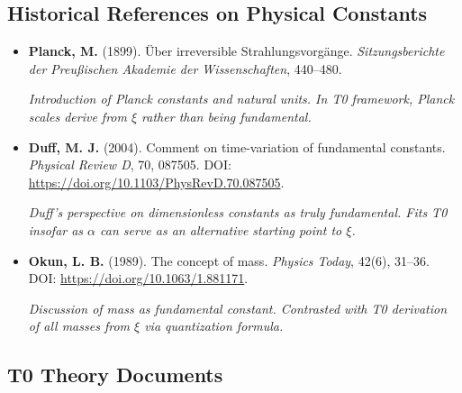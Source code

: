 	\subsection{Historical References on Physical Constants}
	
	\begin{itemize}
		\item \textbf{Planck, M.} (1899). Über irreversible Strahlungsvorgänge. \textit{Sitzungsberichte der Preußischen Akademie der Wissenschaften}, 440--480. 
		
		\textit{Introduction of Planck constants and natural units. In T0 framework, Planck scales derive from $\xi$ rather than being fundamental.}
		
		\item \textbf{Duff, M. J.} (2004). Comment on time-variation of fundamental constants. \textit{Physical Review D}, 70, 087505. DOI: \url{https://doi.org/10.1103/PhysRevD.70.087505}. 
		
		\textit{Duff's perspective on dimensionless constants as truly fundamental. Fits T0 insofar as $\alpha$ can serve as an alternative starting point to $\xi$.}
		
		\item \textbf{Okun, L. B.} (1989). The concept of mass. \textit{Physics Today}, 42(6), 31--36. DOI: \url{https://doi.org/10.1063/1.881171}. 
		
		\textit{Discussion of mass as fundamental constant. Contrasted with T0 derivation of all masses from $\xi$ via quantization formula.}
	\end{itemize}
	
	\subsection{T0 Theory Documents}
	
